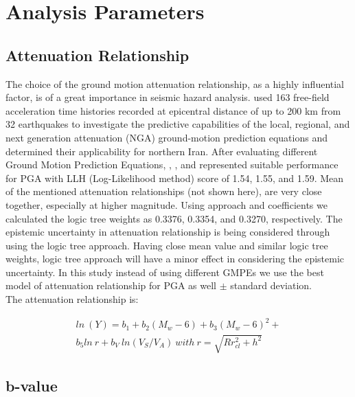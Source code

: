 \section{Analysis Parameters}
\subsection{Attenuation Relationship}

The choice of the ground motion attenuation relationship, as a highly influential factor, is of a great importance in seismic hazard analysis. \citet{Zafarani2014} used 163 free-field acceleration time histories recorded at epicentral distance of up to 200 km from 32 earthquakes to investigate the predictive capabilities of the local, regional, and next generation attenuation (NGA) ground-motion prediction equations and determined their applicability for northern Iran. After evaluating different Ground Motion Prediction Equations, \citet{Kalkan2004}, \citet{Chiou2008}, and \citet{Boore2008} represented suitable performance for  PGA  with LLH (Log-Likelihood method) score of 1.54, 1.55, and 1.59. Mean of the mentioned attenuation relationships (not shown here), are very close together, especially at higher magnitude. Using \citet{Scherbaum2009} approach and \citet{Zafarani2014} coefficients we calculated the logic tree weights as 0.3376, 0.3354, and 0.3270, respectively. The epistemic uncertainty in attenuation relationship is being considered through using the logic tree approach. Having close mean value and similar logic tree weights, logic tree approach will have a minor effect in considering the epistemic uncertainty. In this study instead of using  different GMPEs we use the best model of attenuation relationship for PGA \citep{Zafarani2014} as well $\pm$ standard deviation. \\

\noindent
The attenuation relationship is:

\begin{equation}
\begin{split}
ln\ (Y) = b_1 + b_2(M_w-6) + b_3( M_w-6)^{2}+  \\ 
b_5ln\ r + b_V \ ln(V_S/V_A) \  with \  r= \sqrt{R{r^2_{cl} + h^2}}  
\end{split}
\end{equation}

\subsection{b-value}

